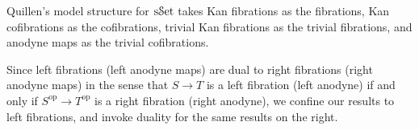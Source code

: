 \begin{remark}\label{2.0.0.2}
	Quillen's model structure for $\mathrm{s}\mathcal{S}\mathrm{et} $ takes Kan fibrations as the fibrations, Kan cofibrations as the cofibrations, trivial Kan fibrations as the trivial fibrations, and anodyne maps as the trivial cofibrations.
\end{remark}
\begin{remark}\label{2.0.0.3}
	Since left fibrations (left anodyne maps) are dual to right fibrations (right anodyne maps) in the sense that $S\to T$ is a left fibration (left anodyne) if and only if $S^{\mathrm{op}} \to T^{\mathrm{op}} $ is a right fibration (right anodyne), we confine our results to left fibrations, and invoke duality for the same results on the right.
\end{remark}


